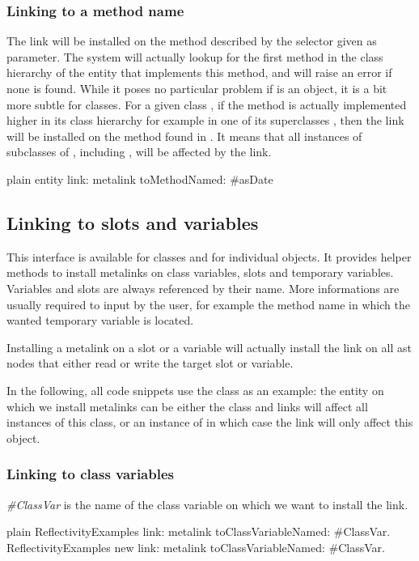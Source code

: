 \documentclass[10pt,twoside,english]{_support/latex/sbabook/sbabook}
\begin{document}
\subsubsection{Linking to a method name}
The link will be installed on the method described by the selector given as parameter. The system will actually lookup for the first method in the class hierarchy of the entity that implements this method, and will raise an error if none is found. While it poses no particular problem if  is an object, it is a bit more subtle for classes. For a given class , if the method is actually implemented higher in its class hierarchy for example in one of its superclasses , then the link will be installed on the method found in . It means that all instances of subclasses of , including , will be affected by the link.

\begin{displaycode}{plain}
entity link: metalink toMethodNamed: #asDate
\end{displaycode}
\subsection{Linking to slots and variables}
This interface is available for classes and for individual objects. It provides helper methods to install metalinks on class variables, slots and temporary variables. Variables and slots are always referenced by their name. More informations are usually required to input by the user, for example the method name in which the wanted temporary variable is located.

Installing a metalink on a slot or a variable will actually install the link on all ast nodes that either read or write the target slot or variable.

In the following, all code snippets use the class  as an example: the entity on which we install metalinks can be either the class  and links will affect all instances of this class, or an instance of  in which case the link will only affect this object.
\subsubsection{Linking to class variables}
\textit{\#ClassVar} is the name of the class variable on which we want to install the link.

\begin{displaycode}{plain}
ReflectivityExamples link: metalink toClassVariableNamed: #ClassVar.
ReflectivityExamples new link: metalink toClassVariableNamed: #ClassVar.
\end{displaycode}
\end{document}
